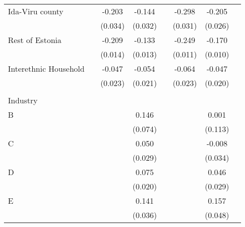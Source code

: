 \begin{longtable}{l*{3}{c}|l*{3}{c}}
Ida-Viru county            &                     &      -0.203\sym{***}&      -0.144\sym{***}&                     &      -0.298\sym{***}&      -0.205\sym{***}\\
&                     &     (0.034)         &     (0.032)         &                     &     (0.031)         &     (0.026)         \\
Rest of Estonia                &                     &      -0.209\sym{***}&      -0.133\sym{***}&                     &      -0.249\sym{***}&      -0.170\sym{***}\\
&                     &     (0.014)         &     (0.013)         &                     &     (0.011)         &     (0.010)         \\
	Interethnic Household&                     &      -0.047\sym{**} &      -0.054\sym{**} &                     &      -0.064\sym{***}&      -0.047\sym{**} \\
	&                     &     (0.023)         &     (0.021)         &                     &     (0.023)         &     (0.020)         \\
	&&&&&&&\\
	Industry &&&&&&\\
	B                   &                     &                     &       0.146\sym{**} &                     &                     &       0.001         \\
	&                     &                     &     (0.074)         &                     &                     &     (0.113)         \\
	C                   &                     &                     &       0.050\sym{*}  &                     &                     &      -0.008         \\
	&                     &                     &     (0.029)         &                     &                     &     (0.034)         \\
	D                   &                     &                     &       0.075\sym{***}&                     &                     &       0.046         \\
	&                     &                     &     (0.020)         &                     &                     &     (0.029)         \\
	E                   &                     &                     &       0.141\sym{***}&                     &                     &       0.157\sym{***}\\
	&                     &                     &     (0.036)         &                     &                     &     (0.048)         \\

\end{longtable}

